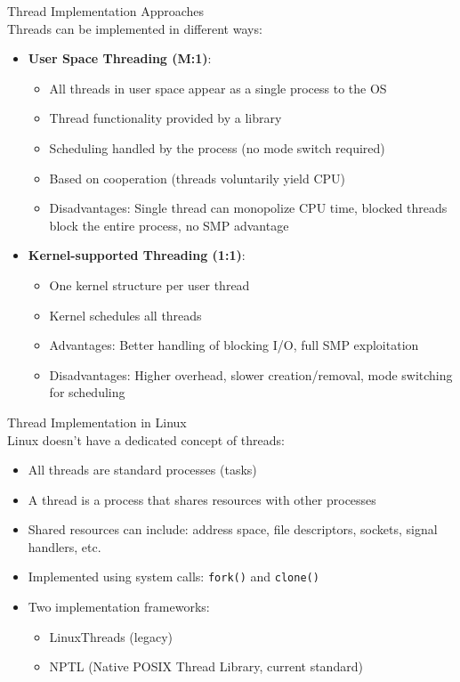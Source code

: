 \begin{definition}{Thread Implementation Approaches}\\
    Threads can be implemented in different ways:
    \begin{itemize}
        \item \textbf{User Space Threading (M:1)}:
            \begin{itemize}
                \item All threads in user space appear as a single process to the OS
                \item Thread functionality provided by a library
                \item Scheduling handled by the process (no mode switch required)
                \item Based on cooperation (threads voluntarily yield CPU)
                \item Disadvantages: Single thread can monopolize CPU time, blocked threads block the entire process, no SMP advantage
            \end{itemize}
        \item \textbf{Kernel-supported Threading (1:1)}:
            \begin{itemize}
                \item One kernel structure per user thread
                \item Kernel schedules all threads
                \item Advantages: Better handling of blocking I/O, full SMP exploitation
                \item Disadvantages: Higher overhead, slower creation/removal, mode switching for scheduling
            \end{itemize}
    \end{itemize}
\end{definition}

\begin{definition}{Thread Implementation in Linux}\\
    Linux doesn't have a dedicated concept of threads:
    \begin{itemize}
        \item All threads are standard processes (tasks)
        \item A thread is a process that shares resources with other processes
        \item Shared resources can include: address space, file descriptors, sockets, signal handlers, etc.
        \item Implemented using system calls: \texttt{fork()} and \texttt{clone()}
        \item Two implementation frameworks:
            \begin{itemize}
                \item LinuxThreads (legacy)
                \item NPTL (Native POSIX Thread Library, current standard)
            \end{itemize}
    \end{itemize}
\end{definition}

